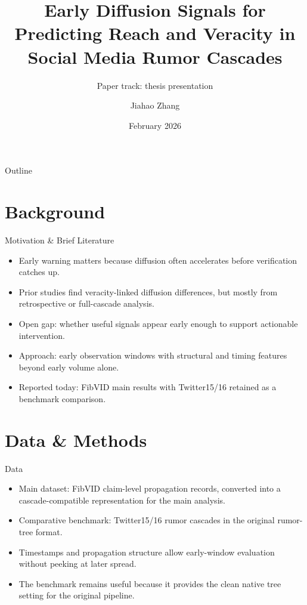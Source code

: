 \documentclass{beamer}
\title{Early Diffusion Signals for Predicting Reach and Veracity in Social Media Rumor Cascades}
\subtitle{Paper track: thesis presentation}
\author{Jiahao Zhang}
\institute{University of Chicago}
\date{February 2026}
\begin{document}
\begin{frame}
\titlepage
\end{frame}

\begin{frame}{Outline}
\tableofcontents
\end{frame}

\section{Background}
\begin{frame}{Motivation \& Brief Literature}
\begin{itemize}
\item Early warning matters because diffusion often accelerates before verification catches up.
\item Prior studies find veracity-linked diffusion differences, but mostly from retrospective or full-cascade analysis.
\item Open gap: whether useful signals appear early enough to support actionable intervention.
\item Approach: early observation windows with structural and timing features beyond early volume alone.
\item Reported today: FibVID main results with Twitter15/16 retained as a benchmark comparison.
\end{itemize}
\end{frame}

\section{Data \& Methods}
\begin{frame}{Data}
\begin{itemize}
\item Main dataset: FibVID claim-level propagation records, converted into a cascade-compatible representation for the main analysis.
\item Comparative benchmark: Twitter15/16 rumor cascades in the original rumor-tree format.
\item Timestamps and propagation structure allow early-window evaluation without peeking at later spread.
\item The benchmark remains useful because it provides the clean native tree setting for the original pipeline.
\end{itemize}
\end{frame}
\end{document}
